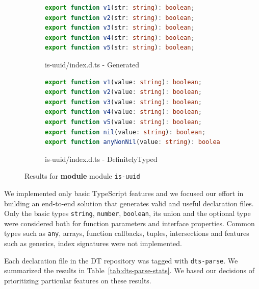 \documentclass[english,cleveref,autoref,submission]{programming}
\newcommand{\figref}[1]{Figure~\ref{#1}}
\begin{document}


\begin{figure}[tp]
  \centering
  \begin{subfigure}{0.48\linewidth}
    \begin{lstlisting}[language=TypeScript,numbers=none]
export function v1(str: string): boolean;
export function v2(str: string): boolean;
export function v3(str: string): boolean;
export function v4(str: string): boolean;
export function v5(str: string): boolean;
    \end{lstlisting}
    \caption{is-uuid/index.d.ts - Generated}
  \end{subfigure}
  \hfill
  \begin{subfigure}{0.48\linewidth}
    \begin{lstlisting}[language=TypeScript,numbers=none]
export function v1(value: string): boolean;
export function v2(value: string): boolean;
export function v3(value: string): boolean;
export function v4(value: string): boolean;
export function v5(value: string): boolean;
export function nil(value: string): boolean;
export function anyNonNil(value: string): boolean;
    \end{lstlisting}
    \caption{is-uuid/index.d.ts - DefinitelyTyped}
  \end{subfigure}

  \caption{Results for \textbf{module}  module \texttt{is-uuid}}
  \label{fig:experiments-results-module-is-uuid}
\end{figure}

We implemented only basic TypeScript features and we focused our effort in building an
end-to-end solution that generates valid and useful declaration files. Only the basic
types \texttt{string}, \texttt{number}, \texttt{boolean}, its union and the optional type were considered
both for function parameters and interface properties. Common types such as
\texttt{any}, arrays, function callbacks, tuples, intersections and features such as
generics, index signatures were not implemented.

Each declaration file in the DT repository was tagged with
\texttt{dts-parse}. We summarized the results in Table~\ref{tab:dts-parse-stats}. We based our decisions of prioritizing particular features on these results.
\end{document}
